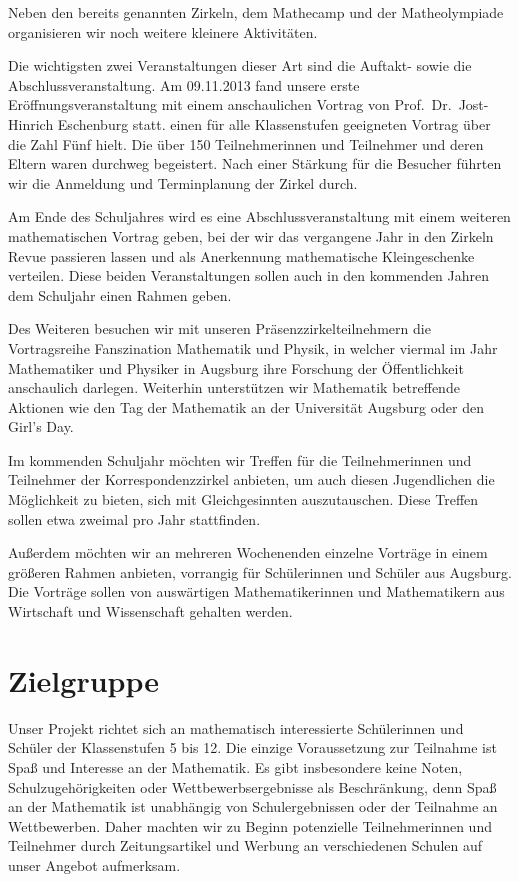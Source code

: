 \documentclass[12pt]{zettel}
\begin{document}
Neben den bereits genannten Zirkeln, dem Mathecamp und der
Matheolympiade organisieren wir noch weitere kleinere
Aktivitäten.

Die wichtigsten zwei Veranstaltungen dieser Art sind die Auftakt- sowie die
Abschlussveranstaltung. Am 09.11.2013 fand unsere erste
Eröffnungsveranstaltung mit einem anschaulichen Vortrag von
Prof.~Dr.~Jost-Hinrich Eschenburg statt.
einen für alle Klassenstufen geeigneten Vortrag über die Zahl Fünf
hielt. Die über 150 Teilnehmerinnen und Teilnehmer und deren Eltern waren durchweg
begeistert. Nach einer Stärkung für die Besucher führten wir
die Anmeldung und Terminplanung der Zirkel durch.

Am Ende des Schuljahres wird es eine Abschlussveranstaltung mit einem
weiteren mathematischen Vortrag geben, bei der wir
das vergangene Jahr in den Zirkeln Revue passieren lassen und als Anerkennung
mathematische Kleingeschenke verteilen. Diese beiden Veranstaltungen sollen
auch in den kommenden Jahren dem Schuljahr einen Rahmen geben.

Des Weiteren besuchen wir mit unseren Präsenzzirkelteilnehmern die
Vortragsreihe Fanszination Mathematik und Physik, in welcher viermal im
Jahr Mathematiker und Physiker in Augsburg ihre Forschung der
Öffentlichkeit anschaulich darlegen. Weiterhin unterstützen wir
Mathematik betreffende Aktionen wie den Tag der Mathematik an
der Universität Augsburg oder den Girl's Day.

Im kommenden Schuljahr möchten wir Treffen für die Teilnehmerinnen und
Teilnehmer der Korrespondenzzirkel anbieten, um auch diesen Jugendlichen die
Möglichkeit zu bieten, sich mit Gleichgesinnten auszutauschen. Diese Treffen
sollen etwa zweimal pro Jahr stattfinden.

Außerdem möchten wir an mehreren Wochenenden einzelne Vorträge in einem
größeren Rahmen anbieten, vorrangig für Schülerinnen und Schüler aus Augsburg.
Die Vorträge sollen von auswärtigen Mathematikerinnen und Mathematikern aus
Wirtschaft und Wissenschaft gehalten werden.


\section{Zielgruppe}

Unser Projekt richtet sich an mathematisch interessierte Schülerinnen
und Schüler der Klassenstufen 5 bis 12. Die einzige Voraussetzung zur
Teilnahme ist Spaß und Interesse an der Mathematik. Es gibt insbesondere
keine Noten, Schulzugehörigkeiten oder Wettbewerbsergebnisse als
Beschränkung, denn Spaß an der Mathematik
ist unabhängig von Schulergebnissen oder der Teilnahme an
Wettbewerben. Daher machten wir zu Beginn potenzielle Teilnehmerinnen und
Teilnehmer durch Zeitungsartikel und Werbung an verschiedenen Schulen
auf unser Angebot aufmerksam.
\end{document}
